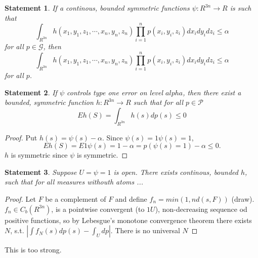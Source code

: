 \documentclass{article}
\newtheorem{statement}{Statement}
\begin{document}
 
\begin{statement}
If a continous, bounded symmetric functions $\psi : R^{3n} \to R$ is such that 
\[
 \int_{R^{3n}} h(x_1,y_1,z_1,\cdots,x_n,y_n,z_n) \prod_{i=1}^n p(x_i,y_i,z_i) d x_i d y_i d z_i \leq \alpha
\]
for all $p \in \mathcal G$, then 
\[
 \int_{R^{3n}} h(x_1,y_1,z_1,\cdots,x_n,y_n,z_n) \prod_{i=1}^n p(x_i,y_i,z_i) d x_i d y_i d z_i \leq \alpha
\]
for all $p$.
\end{statement}
 

{ \color{ForestGreen} 
\begin{statement}
If $\psi$ controls type one error on level $alpha$, then there exist a bounded, symmetric function $h: R^{3n} \to R$ such that for all $p \in \mathcal{P}$ 
\[
 E h(S) = \int_{R^{3n}} h(s) dp(s)  \leq 0
\]
\end{statement}

\begin{proof}
 Put $h(s) = \psi(s) - \alpha$. Since $\psi(s)= 1{ \psi(s)=1} $, 
 \[
  E h(S)  = E 1{ \psi(s)=1}  - \alpha = p(\psi(s)=1)  - \alpha \leq 0.
 \]
$h$ is symmetric since $\psi$ is symmetric. 
\end{proof}

\begin{statement}
 Suppose $U= {\psi =1}$ is open. There exists continous, bounded $h$, such that for all measures withouth atoms ...
\end{statement}
\begin{proof}
 Let $F$ be a complement of $F$ and define $f_n = min(1,nd(s,F))$ (draw). $f_n \in C_b(R^{3n})$, is a  pointwise convergent (to $1U$), non-decreasing sequence od positive functions, so by Lebesgue's monotone convergence theorem there exists $N$, s.t. $|\int f_N(s) dp(s) -\int_U dp|$. There is no universal $N$  
\end{proof}
}

This is too strong.
\end{document}
